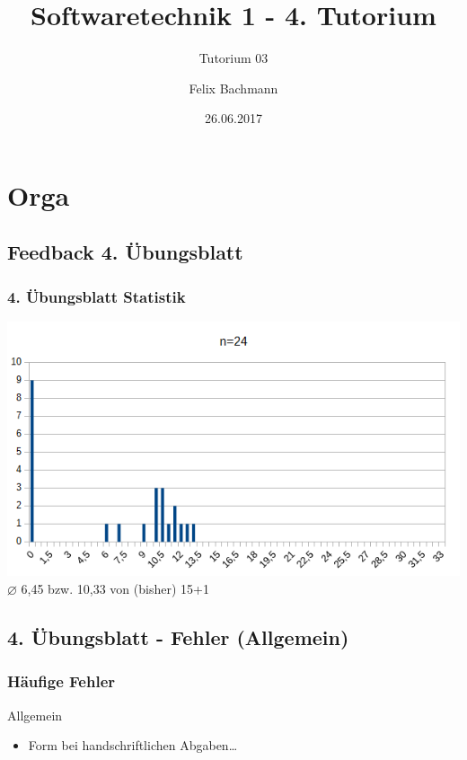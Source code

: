 \documentclass[18pt]{beamer}
\title[SWT1]{Softwaretechnik 1 - 4. Tutorium}
\subtitle{Tutorium 03}
\author{Felix Bachmann}
\date{26.06.2017}
\institute{KIT - Institut für Programmstrukturen und Datenorganisation (IPD)}
\begin{document}

\begin{frame}
\titlepage
\end{frame}


\section{Orga}


	\subsection{Feedback 4. Übungsblatt}
	\begin{frame}
		\frametitle{4. Übungsblatt Statistik}
		\includegraphics[scale=0.7]{./pics/tut4/statistics-ub4.png}
		\linebreak \centering $\diameter$ 6,45 bzw. 10,33 von (bisher) 15+1
	\end{frame}
	
	\subsection{4. Übungsblatt - Fehler (Allgemein)}
	\begin{frame}
		\frametitle{Häufige Fehler}
		\begin{block}{Allgemein}
			\begin{itemize}
				\item Form bei handschriftlichen Abgaben\dots
			\end{itemize}
		\end{block}
	\end{frame}
	
\end{document}
